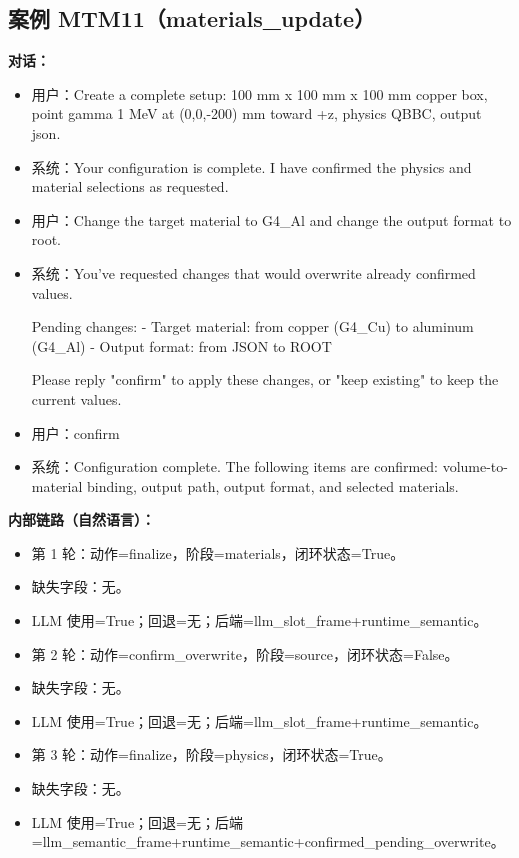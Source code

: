 \documentclass[11pt]{ctexart}
\begin{document}
\subsection{案例 MTM11（materials\_update）}
\textbf{对话：}
\begin{itemize}
\item 用户：Create a complete setup: 100 mm x 100 mm x 100 mm copper box, point gamma 1 MeV at (0,0,-200) mm toward +z, physics QBBC, output json.
\item 系统：Your configuration is complete. I have confirmed the physics and material selections as requested.
\item 用户：Change the target material to G4\_Al and change the output format to root.
\item 系统：You've requested changes that would overwrite already confirmed values.

Pending changes:
- Target material: from copper (G4\_Cu) to aluminum (G4\_Al)
- Output format: from JSON to ROOT

Please reply "confirm" to apply these changes, or "keep existing" to keep the current values.
\item 用户：confirm
\item 系统：Configuration complete. The following items are confirmed: volume-to-material binding, output path, output format, and selected materials.
\end{itemize}
\textbf{内部链路（自然语言）：}
\begin{itemize}
\item 第 1 轮：动作=finalize，阶段=materials，闭环状态=True。
\item 缺失字段：无。
\item LLM 使用=True；回退=无；后端=llm\_slot\_frame+runtime\_semantic。
\item 第 2 轮：动作=confirm\_overwrite，阶段=source，闭环状态=False。
\item 缺失字段：无。
\item LLM 使用=True；回退=无；后端=llm\_slot\_frame+runtime\_semantic。
\item 第 3 轮：动作=finalize，阶段=physics，闭环状态=True。
\item 缺失字段：无。
\item LLM 使用=True；回退=无；后端=llm\_semantic\_frame+runtime\_semantic+confirmed\_pending\_overwrite。
\end{itemize}
\end{document}
